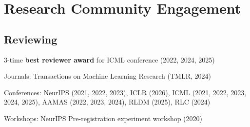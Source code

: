 \documentclass[a4paper,12pt]{article}
\begin{document}
\section{Research Community Engagement}

\subsection{Reviewing}
\begin{expblock}
    \begin{explist}
	\item 3-time \textbf{best reviewer award} for ICML conference (2022, 2024, 2025)
	\item Journals: Transactions on Machine Learning Research (TMLR, 2024)
	\item Conferences: NeurIPS (2021, 2022, 2023), ICLR (2026), ICML (2021, 2022, 2023, 2024, 2025), AAMAS (2022, 2023, 2024), RLDM (2025), RLC (2024)
	\item Workshops: NeurIPS Pre-registration experiment workshop (2020)
    \end{explist}
\end{expblock}
\end{document}
